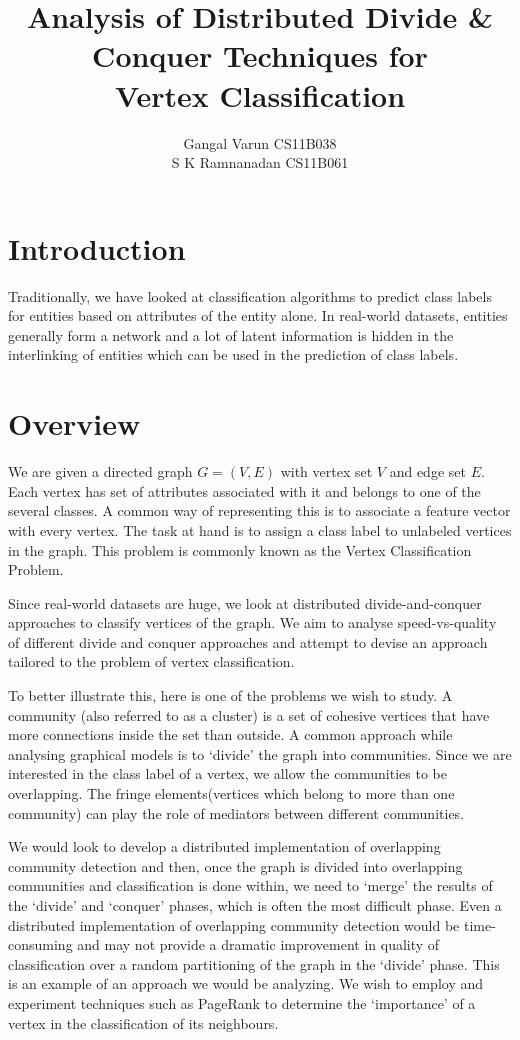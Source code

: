 \documentclass{article}
\begin{document}
\title{\textbf{Analysis of Distributed Divide \& Conquer Techniques for \\Vertex Classification}}
\author{ Gangal Varun CS11B038 \\
		 S K Ramnanadan CS11B061\\
[0.2in]
}
\date{}
\maketitle
\section*{Introduction}
Traditionally, we have looked at classification algorithms to predict class labels for entities based on attributes of the entity alone. In real-world datasets, entities generally form a network and a lot of latent information is hidden in the interlinking of entities which can be used in the prediction of class labels. 
 


\section*{Overview}
We are given a directed graph $G=(V,E)$ with vertex set $V$ and edge set $E$. Each vertex has set of attributes associated with it and belongs to one of the several classes. A common way of representing this is to associate a feature vector with every vertex. The task at hand is to assign a class label to unlabeled vertices in the graph. This problem is commonly known as the Vertex Classification Problem. 

Since real-world datasets are huge, we look at distributed divide-and-conquer approaches to classify vertices of the graph. We aim to analyse speed-vs-quality of different divide and conquer approaches and attempt to devise an approach tailored to the problem of vertex classification. 

To better illustrate this, here is one of the problems we wish to study. A community (also referred to as a cluster) is a set of cohesive vertices that have more connections inside the set than outside. A common approach while analysing graphical models is to ‘divide’ the graph into communities. Since we are interested in the class label of a vertex, we allow the communities to be overlapping. The fringe elements(vertices which belong to more than one community) can play the role of mediators between different communities. 

We would look to develop a distributed implementation of overlapping community detection and then, once the graph is divided into overlapping communities and classification is done within, we need to ‘merge’ the results of the ‘divide’ and ‘conquer’ phases, which is often the most difficult phase. Even a distributed implementation of overlapping community detection would be time-consuming and may not provide a dramatic improvement in quality of classification over a random partitioning of the graph in the ‘divide’ phase. This is an example of an approach we would be analyzing. We wish to employ and experiment techniques such as PageRank to determine the ‘importance’ of a vertex in the classification of its neighbours.
\end{document}
